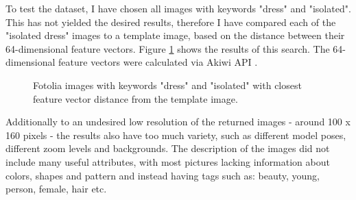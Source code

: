 \documentclass{article}
\begin{document}
To test the dataset, I have chosen all images with keywords "dress" and "isolated". This has not yielded the desired results, therefore I have compared each of the "isolated dress" images to a template image, based on the distance between their 64-dimensional feature vectors. Figure \ref{fig:fotolia} shows the results of this search. The 64-dimensional feature vectors were calculated via Akiwi API \cite{sonnenberg_akiwi_nodate}.

\begin{figure}[h]
\centering
{}\hspace{1cm}
\caption{\label{fig:fotolia} Fotolia images with keywords "dress" and "isolated" with closest feature vector distance from the template image.}
\end{figure}


Additionally to an undesired low resolution of the returned images - around 100 x 160 pixels - the results also have too much variety, such as different model poses, different zoom levels and backgrounds. The description of the images did not include many useful attributes, with most pictures lacking information about colors, shapes and pattern and instead having tags such as: beauty, young, person, female, hair etc.
\end{document}

